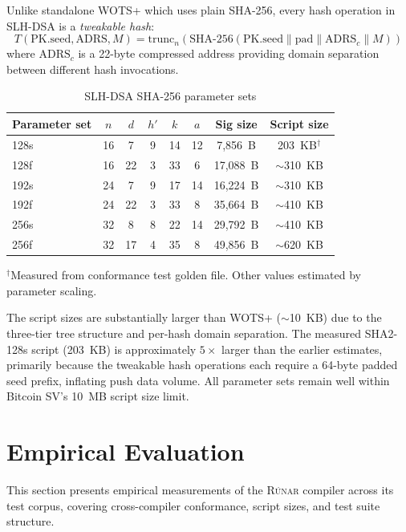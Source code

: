 \documentclass[11pt,a4paper]{article}
\newcommand{\runar}{\textsc{Rúnar}}
\begin{document}
Unlike standalone WOTS+ which uses plain SHA-256, every hash operation in
SLH-DSA is a \emph{tweakable hash}:
\[
  T(\text{PK.seed}, \text{ADRS}, M) =
  \text{trunc}_n\!\left(\text{SHA-256}(\text{PK.seed} \| \text{pad} \| \text{ADRS}_c \| M)\right)
\]
where $\text{ADRS}_c$ is a 22-byte compressed address providing domain
separation between different hash invocations.

\begin{table}[h]
\centering
\caption{SLH-DSA SHA-256 parameter sets}
\label{tab:slhdsa}
\begin{tabular}{@{}lccccccc@{}}
\toprule
Parameter set & $n$ & $d$ & $h'$ & $k$ & $a$ & Sig size & Script size \\
\midrule
128s & 16 & 7 & 9 & 14 & 12 & 7,856~B & 203~KB$^\dagger$ \\
128f & 16 & 22 & 3 & 33 & 6 & 17,088~B & $\sim$310~KB \\
192s & 24 & 7 & 9 & 17 & 14 & 16,224~B & $\sim$310~KB \\
192f & 24 & 22 & 3 & 33 & 8 & 35,664~B & $\sim$410~KB \\
256s & 32 & 8 & 8 & 22 & 14 & 29,792~B & $\sim$410~KB \\
256f & 32 & 17 & 4 & 35 & 8 & 49,856~B & $\sim$620~KB \\
\bottomrule
\end{tabular}
\vspace{0.3em}
\footnotesize{$^\dagger$Measured from conformance test golden file.
  Other values estimated by parameter scaling.}
\end{table}

The script sizes are substantially larger than WOTS+ ($\sim$10~KB)
due to the three-tier tree structure and per-hash domain separation.
The measured SHA2-128s script (203~KB) is approximately $5\times$ larger
than the earlier estimates, primarily because the tweakable hash
operations each require a 64-byte padded seed prefix, inflating push
data volume. All parameter sets remain well within Bitcoin SV's 10~MB
script size limit.

\section{Empirical Evaluation}
\label{sec:evaluation}

This section presents empirical measurements of the \runar{} compiler across
its test corpus, covering cross-compiler conformance, script sizes, and
test suite structure.
\end{document}
